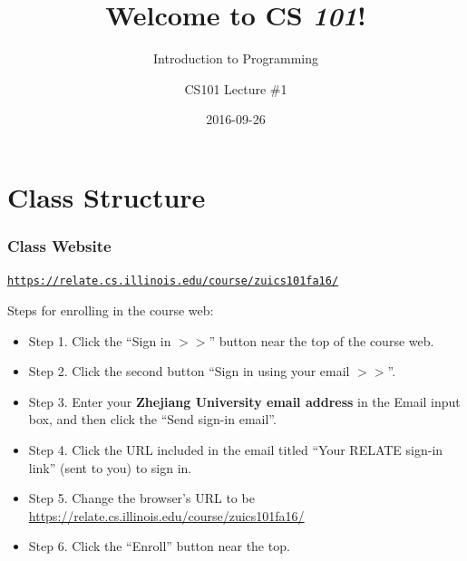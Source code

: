 \documentclass[11pt]{beamer}
\title{Welcome to CS \emph{101}!}
\subtitle{Introduction to Programming}
\author{CS101 Lecture \#1}
\date{2016-09-26}
\begin{document}

\newcommand{\Enlarge}{\large}
\newcommand{\CSBase}{blue}
\newcommand{\CSGradBot}{orange}
\newcommand{\CSAltDark}{black}
\newcommand{\CSPureBase}{blue}

\newcommand{\myitem}{\item}
\newcommand{\mysubitem}{\item}


\frame{\titlepage}

\setcounter{framenumber}{0}

\section{Class Structure}

\begin{frame}[plain,c]
  \frametitle{Class Website}
  \Enlarge 

  \begin{center}
    \textcolor{\CSBase}{\small \texttt{\url{https://relate.cs.illinois.edu/course/zuics101fa16/}}}
  \end{center}
     Steps for enrolling in the course web:
     \begin{itemize}  
     	\myitem Step 1. Click the ``Sign in $>>$'' button near the top of the course web.
     	\myitem Step 2. Click the second button ``Sign in using your email $>>$''.   	
     	\myitem Step 3. Enter your \textbf{Zhejiang University email address} in the Email input box, and then click the ``Send sign-in email''.
     	\myitem Step 4. Click the URL included in the email titled ``Your RELATE sign-in link'' (sent to you) to sign in.
     	\myitem Step 5. Change the browser's URL to be \small{\url{https://relate.cs.illinois.edu/course/zuics101fa16/}}
     	\myitem \large{Step 6. Click the ``Enroll'' button near the top.}
     \end{itemize}
\end{frame}
\end{document}
